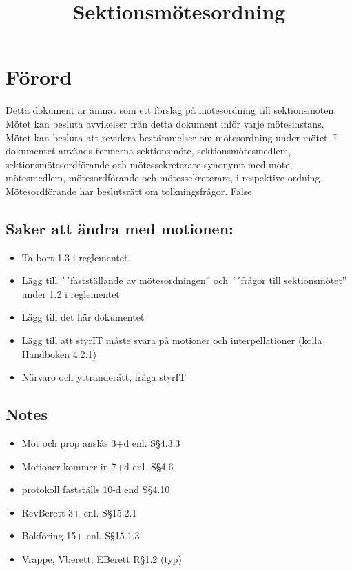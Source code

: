 \documentclass[11pt, includeaddress]{classes/cthit}
\begin{document}
\title{Sektionsmötesordning}
\maketitle

\thispagestyle{empty}

\newpage

\makeheadfoot%
\newpage
\thispagestyle{empty}

\section*{Förord}
Detta dokument är ämnat som ett förslag på mötesordning till sektionsmöten.
Mötet kan besluta avvikelser från detta dokument inför varje mötesinstans.
Mötet kan besluta att revidera bestämmelser om mötesordning under mötet.
I dokumentet används termerna sektionsmöte, sektionsmötesmedlem, sektionsmötesordförande och mötessekreterare synonymt med möte, mötesmedlem, mötesordförande och mötessekreterare, i respektive ordning.
Mötesordförande har beslutsrätt om tolkningsfrågor.
\if False
\subsection*{Saker att ändra med motionen:}
\begin{itemize}
    \item Ta bort 1.3 i reglementet.
    \item Lägg till ´´fastställande av mötesordningen'' och ´´frågor till sektionsmötet'' under 1.2 i reglementet
    \item Lägg till det här dokumentet
    \item Lägg till att styrIT måste svara på motioner och interpellationer (kolla Handboken 4.2.1)
    \item Närvaro och yttranderätt, fråga styrIT
\end{itemize}
\subsection*{Notes}
\begin{itemize}
    \item Mot och prop anslås 3+d enl. S§4.3.3
    \item Motioner kommer in 7+d enl. S§4.6
    \item protokoll fastställs 10-d end S§4.10
    \item RevBerett 3+ enl. S§15.2.1
    \item Bokföring 15+ enl. S§15.1.3
    \item Vrappe, Vberett, EBerett R§1.2 (typ)
\end{itemize}
\fi
\newpage
\setcounter{tocdepth}{2}
\setcounter{page}{1}
\tableofcontents
\end{document}
